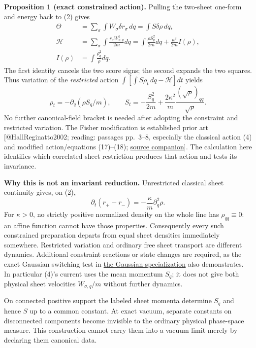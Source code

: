 \documentclass[11pt,a4paper]{article}
\begin{document}
\textbf{Proposition 1 (exact constrained action).} Pulling the two-sheet
one-form and energy back to (2) gives \[\begin{aligned}
\Theta&=\sum_\sigma\int W_\sigma\delta r_\sigma\,dq
       =\int S\delta\rho\,dq,\\
\mathcal H&=\sum_\sigma\int\frac{r_\sigma W_{\sigma,q}^2}{2m}dq
 =\int\frac{\rho S_q^2}{2m}dq+\frac{\kappa^2}{2m}I(\rho),\\
I(\rho)&=\int\frac{\rho_q^2}{\rho}dq.
\end{aligned}\tag{3}\] The first identity cancels the two score signs;
the second expands the two squares. Thus variation of the
\emph{restricted} action \(\int[\int S\rho_t\,dq-\mathcal H]dt\) yields
\[\rho_t=-\partial_q(\rho S_q/m),\qquad
S_t=-\frac{S_q^2}{2m}
 +\frac{2\kappa^2}{m}\frac{(\sqrt\rho)_{qq}}{\sqrt\rho}.\tag{4}\] No
further canonical-field bracket is needed after adopting the constraint
and restricted variation. The Fisher modification is established prior
art {[}@HallReginatto2002; reading: passages pp.~3--8, especially the
classical action (4) and modified action/equations (17)--(18);
\href{../docs/batches/B09/Hall_Reginatto_2002.md}{source companion}{]}.
The calculation here identifies which correlated sheet restriction
produces that action and tests its invariance.

\textbf{Why this is not an invariant reduction.} Unrestricted classical
sheet continuity gives, on (2), \[\partial_t(r_+-r_-)
 =-\frac\kappa m\partial_q^2\rho.\tag{5}\] For \(\kappa>0\), no strictly
positive normalized density on the whole line has \(\rho_{qq}\equiv0\):
an affine function cannot have those properties. Consequently every such
constrained preparation departs from equal sheet densities immediately
somewhere. Restricted variation and ordinary free sheet transport are
different dynamics. Additional constraint reactions or state changes are
required, as the exact Gaussian switching test in
\protect\hyperlink{the-gaussian-switching-specialization}{the Gaussian
specialization} also demonstrates. In particular (4)'s current uses the
mean momentum \(S_q\); it does not give both physical sheet velocities
\(W_{\sigma,q}/m\) without further dynamics.

On connected positive support the labeled sheet momenta determine
\(S_q\) and hence \(S\) up to a common constant. At exact vacuum,
separate constants on disconnected components become invisible to the
ordinary physical phase-space measure. This construction cannot carry
them into a vacuum limit merely by declaring them canonical data.
\end{document}
